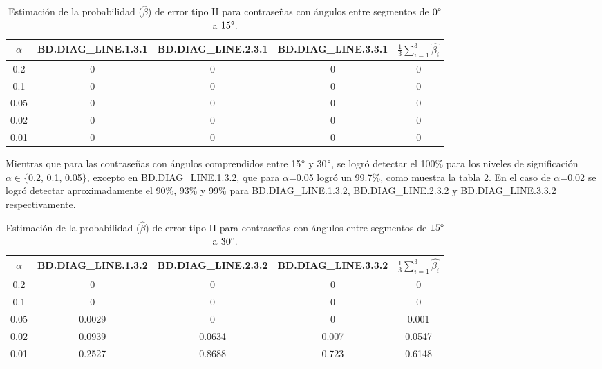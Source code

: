 \documentclass[12pt]{report}
\begin{document}
\begin{table}[h!]
	\centering
	\begin{tabular}{|c|ccc|c|}
		\hline
		$\alpha$& BD.DIAG\_LINE.1.3.1 & BD.DIAG\_LINE.2.3.1 & BD.DIAG\_LINE.3.3.1  & $\frac{1}{3} \sum_{i=1}^{3} \hat{\beta_i}$ \\
		\hline
		0.2 & 0    & 0      & 0   &0 \\
		0.1 & 0    & 0      & 0   & 0\\
		0.05& 0    & 0  	& 0   & 0\\
		0.02& 0    & 0      & 0   & 0\\
		0.01& 0    & 0     & 0    & 0\\
		\hline
	\end{tabular}
	\caption{Estimación de la probabilidad ($\hat{\beta}$) de error tipo II para contraseñas con ángulos entre segmentos de $0\degree$ a $15\degree$.}
	\label{tab:error2-0-15}
\end{table}


Mientras que para las contraseñas con ángulos comprendidos entre 15$\degree$ y 30$\degree$, se logró detectar el 100\% para los niveles de significación $\alpha \in \{$0.2, 0.1, 0.05$\}$, excepto en BD.DIAG\_LINE.1.3.2, que para $\alpha$=0.05 logró un 99.7\%, como muestra la tabla \ref{tab:error2-15-30}. En el caso de $\alpha$=0.02 se logró detectar aproximadamente el 90\%, 93\% y 99\% para BD.DIAG\_LINE.1.3.2, BD.DIAG\_LINE.2.3.2 y BD.DIAG\_LINE.3.3.2 respectivamente.

\begin{table}[h!]
	\centering
	\begin{tabular}{|c|ccc|c|}
		\hline
		$\alpha$& BD.DIAG\_LINE.1.3.2 & BD.DIAG\_LINE.2.3.2 & BD.DIAG\_LINE.3.3.2 &$\frac{1}{3} \sum_{i=1}^{3} \hat{\beta_i}$ \\
		\hline
		0.2 & 0     	    & 0     		& 0     & 0    \\
		0.1 & 0			    & 0   	   	    & 0     &  0   \\
		0.05& 0.0029     	& 0     	 & 0     & 0.001 \\
		0.02& 0.0939     	& 0.0634   	 & 0.007 & 0.0547    \\
		0.01& 0.2527     	& 0.8688   & 0.723 & 0.6148     \\
		\hline
	\end{tabular}
	\caption{Estimación de la probabilidad ($\hat{\beta}$) de error tipo II para contraseñas con ángulos entre segmentos de $15\degree$ a $30\degree$.}
	\label{tab:error2-15-30}
\end{table}
\end{document}
